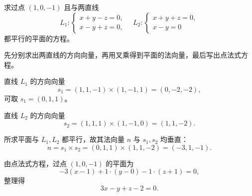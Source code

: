\documentclass[answer]{THUExam}
\begin{document}
\newpage
{}

\begin{problem}
求过点 $(1,0,-1)$ 且与两直线
\[
L_1:\left\{\begin{array}{l}x+y-z=0,\\ x-y+z=0,\end{array}\right.
\quad
L_2:\left\{\begin{array}{l}x+y+z=0,\\ x-y=0\end{array}\right.
\]
都平行的平面的方程。
\end{problem}
\begin{note}
先分别求出两直线的方向向量，再用叉乘得到平面的法向量，最后写出点法式方程。
\end{note}
\begin{solution}
直线 $L_1$ 的方向向量
\[
s_1=(1,1,-1)\times(1,-1,1)=(0,-2,-2),
\]
可取 $s_1=(0,1,1)$。

直线 $L_2$ 的方向向量
\[
s_2=(1,1,1)\times(1,-1,0)=(1,1,-2).
\]

所求平面与 $L_1,L_2$ 都平行，故其法向量 $n$ 与 $s_1,s_2$ 均垂直：
\[
n=s_1\times s_2=(0,1,1)\times(1,1,-2)=(-3,1,-1).
\]

由点法式方程，过点 $(1,0,-1)$ 的平面为
\[
-3(x-1)+1\cdot(y-0)-1\cdot(z+1)=0,
\]
整理得
\[
\boxed{3x-y+z-2=0}.
\]
\end{solution}
\end{document}
